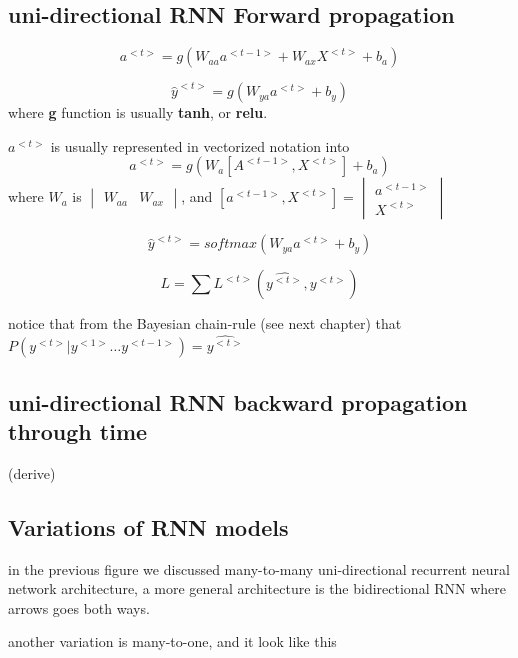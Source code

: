 \documentclass[4apaper,12pt]{book}
\begin{document}
\begin{description}
\begin{description}
      \section{uni-directional RNN Forward propagation}
      \begin{description}
      \item $$a^{<t>} = g(W_{aa}a^{<t-1>} + W_{ax}X^{<t>} + b_a) $$
      \item $$\hat{y}^{<t>} = g(W_{ya}a^{<t>} + b_y) $$  where \textbf{g} function is usually \textbf{tanh}, or \textbf{relu}.
      \item  $a^{<t>}$ is usually represented in vectorized notation into  $$ a^{<t>} = g(W_{a}[A^{<t-1>}, X^{<t>}] + b_a) $$ where $W_a$ is $\begin{vmatrix}W_{aa} & {W_{ax}}\end{vmatrix}$, and $[a^{<t-1>}, X^{<t>}]=\begin{vmatrix} a^{<t-1>} \\ X^{<t>} \end{vmatrix}$
      \item $$ \hat{y}^{<t>} = softmax(W_{ya}a^{<t>} + b_y) $$
      \item $$L=\sum {L^{<t>}(\hat{y^{<t>}},y^{<t>})}$$

      \item notice that from the Bayesian chain-rule (see next chapter) that $P(y^{<t>}|y^{<1>}\dots{y^{<t-1>}})=\hat{y^{<t>}}$
        \section{uni-directional RNN backward propagation through time}
        \begin{description}
        \item (derive)
        \end{description}
        \section {Variations of RNN models}
        \begin{description}
        \item in the previous figure we discussed many-to-many uni-directional recurrent neural network architecture, a more general architecture is the bidirectional RNN where arrows goes both ways.
        \item another variation is many-to-one, and it look like this

\end{description}
\end{description}
\end{description}
\end{description}
\end{document}
